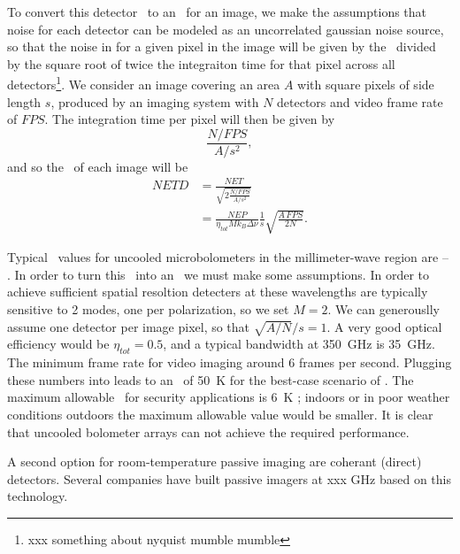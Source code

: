 To convert this detector \NET\ to an \NETD\ for an image, we make the assumptions that noise for each detector can be modeled as an uncorrelated gaussian noise source, so that the noise in for a given pixel in the image will be given by the \NET\ divided by the square root of twice the integraiton time for that pixel across all detectors\footnote{%
  xxx something about nyquist mumble mumble
}. 
We consider an image covering an area $A$ with square pixels of side length $s$, produced by an imaging system with $N$ detectors and video frame rate of $FPS$.
The integration time per pixel will then be given by
\begin{equation}
  \frac{N / FPS}{A / s^2},
\end{equation}
and so the \NETD\ of each image will be
\begin{align}
  NETD & = \frac{NET}{\sqrt{ 2 \frac{N / FPS}{A / s^2}}} \\
       & = \frac{NEP}{\eta_{tot} M k_B \Delta \nu} \frac{1}{s} \sqrt{\frac{A\,FPS}{2 N}} .
       \label{eqn:ch1-netd-defn}
\end{align}

Typical \NEP\ values for uncooled microbolometers in the millimeter-wave region are -- \cite{that military report}.
In order to turn this \NEP\ into an \NETD\ we must make some assumptions.
In order to achieve sufficient spatial resoltion detecters at these wavelengths are typically sensitive to 2 modes, one per polarization, so we set $M = 2$.
We can generouslly assume one detector per image pixel, so that $\sqrt{A/N}/s = 1$.
A very good optical efficiency would be $\eta_{tot} = 0.5$, and a typical bandwidth at \SI{350}{\GHz} is \SI{35}{\GHz}.
The minimum frame rate for video imaging around 6 frames per second.
Plugging these numbers into  leads to an \NETD\ of \SI{50}{\K} for the best-case scenario of  \NEP.
The maximum allowable \NETD\ for security applications is \SI{6}{\K} \cite{military}; indoors or in poor weather conditions outdoors the maximum allowable value would be smaller.
It is clear that uncooled bolometer arrays can not achieve the required performance.

A second option for room-temperature passive imaging are coherant (direct) detectors. 
Several companies have built passive imagers at xxx GHz based on this technology.

